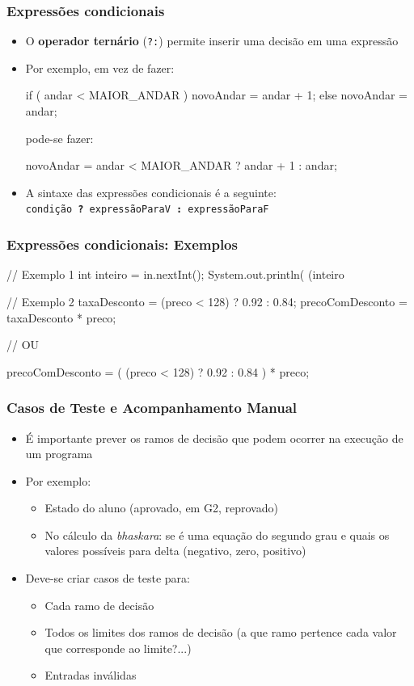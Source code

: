 \documentclass[xcolor={dvipsnames,table},aspectratio=169]{beamer}
\begin{document}
\begin{frame}[fragile]\frametitle{Expressões condicionais}
\begin{itemize}
	\item O \textbf{operador ternário} (\texttt{?:}) permite inserir uma decisão em uma expressão
	\item Por exemplo, em vez de fazer:
\begin{javacode}
if ( andar < MAIOR_ANDAR )
  novoAndar =  andar  + 1;
else
  novoAndar = andar;
\end{javacode}
pode-se fazer:
\begin{javacode}
novoAndar = andar < MAIOR_ANDAR ? andar + 1 : andar;
\end{javacode}
	\item A sintaxe das expressões condicionais é a seguinte:\\
	\texttt{condição \textbf{?} expressãoParaV \textbf{:} expressãoParaF}
\end{itemize}
\end{frame}

\begin{frame}[fragile]\frametitle{Expressões condicionais: Exemplos}
\begin{javacode}
// Exemplo 1
int inteiro = in.nextInt();
System.out.println( (inteiro%

// Exemplo 2
taxaDesconto = (preco < 128) ? 0.92 : 0.84;
precoComDesconto = taxaDesconto * preco;

// OU

precoComDesconto = ( (preco < 128) ? 0.92 : 0.84 ) * preco;
\end{javacode}
\end{frame}
	
\begin{frame}\frametitle{Casos de Teste e Acompanhamento Manual}
\begin{itemize}
	\item É importante prever os ramos de decisão que podem ocorrer na execução de um programa
	\item Por exemplo:
	\begin{itemize}
		\item Estado do aluno (aprovado, em G2, reprovado)
		\item No cálculo da \emph{bhaskara}: se é uma equação do segundo grau e quais os valores possíveis para delta (negativo, zero, positivo)
	\end{itemize}
	\item Deve-se criar casos de teste para:
	\begin{itemize}
		\item Cada ramo de decisão
		\item Todos os limites dos ramos de decisão (a que ramo pertence cada valor que corresponde ao limite?...)
		\item Entradas inválidas
	\end{itemize}
\end{itemize}
\end{frame}
\end{document}
